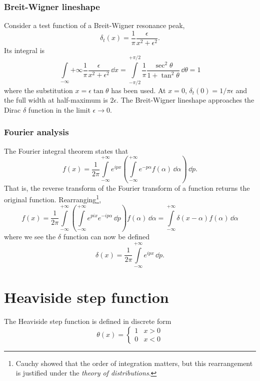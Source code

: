 \subsubsection{Breit-Wigner lineshape}
Consider a test function of a Breit-Wigner resonance peak,
\begin{equation}
\delta_t(x) = \frac{1}{\pi} \frac{\epsilon}{x^2 + \epsilon^2}.
\end{equation}
Its integral is
\begin{equation}
\int\limits_{-\infty}{+\infty} \frac{1}{\pi} \frac{\epsilon}{x^2 + \epsilon^2} \, \dd{x} = \int\limits_{-{\pi}/{2}}^{+{\pi}/{2}} \frac{1}{\pi} \frac{\sec^2{\theta}}{1+\tan^2{\theta}} \, \dd{\theta} = 1
\end{equation}
where the substitution $x = \epsilon \tan \theta$ has been used. At $x=0$, $\delta_t(0) = 1/\pi\epsilon$ and the full width at half-maximum is $2\epsilon$. The Breit-Wigner lineshape approaches the Dirac $\delta$ function in the limit $\epsilon\rightarrow 0$.

\subsubsection{Fourier analysis}
The Fourier integral theorem states that
\begin{equation}
f(x) = \frac{1}{2\pi} \int\limits_{-\infty}^{+\infty} e^{ipx} \left( \int\limits_{-\infty}^{+\infty} e^{-p\alpha} f(\alpha) \, \dd{\alpha} \right) \, \dd{p}.
\end{equation}
That is, the reverse transform of the Fourier transform of a function returns the original function. Rearranging\footnote{Cauchy showed that the order of integration matters, but this rearrangement is justified under the \emph{theory of distributions}.},
\begin{equation}
f(x) = \frac{1}{2\pi} \int\limits_{-\infty}^{+\infty} \left( \int\limits_{-\infty}^{+\infty} e^{pix} e^{-ip\alpha} \, \dd{p} \right) f(\alpha) \, \dd{\alpha} = \int\limits_{-\infty}^{+\infty} \delta(x-\alpha) f(\alpha) \, \dd{\alpha}
\end{equation}
where we see the $\delta$ function can now be defined
\begin{equation}
\delta(x) = \frac{1}{2\pi} \int\limits_{-\infty}^{+\infty} e^{ipx} \, \dd{p}.
\end{equation}

\section{Heaviside step function}
The Heaviside step function is defined in discrete form
\begin{equation}
\theta(x) =
\begin{cases}
1 & x > 0 \\
0 & x < 0
\end{cases}
\end{equation}

